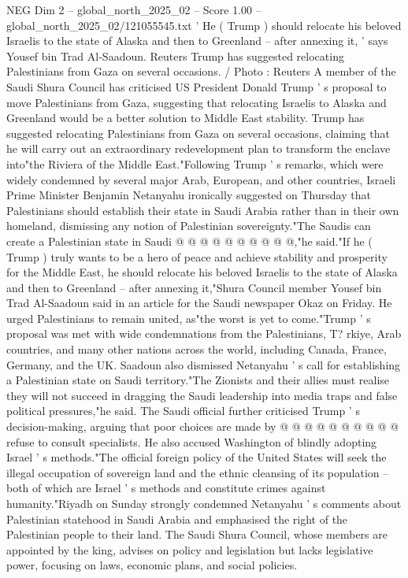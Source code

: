 \begin{textsample}{NEG Dim 2 – global\_north\_2025\_02 – Score 1.00 – global\_north\_2025\_02/121055545.txt}  \label{ex:f2_neg_017}
' He ( Trump ) should relocate his beloved Israelis to the state of Alaska and then to Greenland -- after annexing it, ' says Yousef bin Trad Al-Saadoun.
Reuters Trump has suggested relocating Palestinians from Gaza on several occasions. / Photo : Reuters A member of the Saudi Shura Council has criticised US President Donald Trump ' s proposal to move Palestinians from Gaza, suggesting that relocating Israelis to Alaska and Greenland would be a better solution to Middle East stability.
Trump has suggested relocating Palestinians from Gaza on several occasions, claiming that he will carry out an extraordinary redevelopment plan to transform the enclave into"the Riviera of the Middle East."Following Trump ' s remarks, which were widely condemned by several major Arab, European, and other countries, Israeli Prime Minister Benjamin Netanyahu ironically suggested on Thursday that Palestinians should establish their state in Saudi Arabia rather than in their own homeland, dismissing any notion of Palestinian sovereignty."The Saudis can create a Palestinian state in Saudi @ @ @ @ @ @ @ @ @ @,"he said."If he ( Trump ) truly wants to be a hero of peace and achieve stability and prosperity for the Middle East, he should relocate his beloved Israelis to the state of Alaska and then to Greenland -- after annexing it,"Shura Council member Yousef bin Trad Al-Saadoun said in an article for the Saudi newspaper Okaz on Friday.
He urged Palestinians to remain united, as"the worst is yet to come."Trump ' s proposal was met with wide condemnations from the Palestinians, T? rkiye, Arab countries, and many other nations across the world, including Canada, France, Germany, and the UK.
Saadoun also dismissed Netanyahu ' s call for establishing a Palestinian state on Saudi territory."The Zionists and their allies must realise they will not succeed in dragging the Saudi leadership into media traps and false political pressures,"he said.
The Saudi official further criticised Trump ' s decision-making, arguing that poor choices are made by @ @ @ @ @ @ @ @ @ @ refuse to consult specialists.
He also accused Washington of blindly adopting Israel ' s methods."The official foreign policy of the United States will seek the illegal occupation of sovereign land and the ethnic cleansing of its population -- both of which are Israel ' s methods and constitute crimes against humanity."Riyadh on Sunday strongly condemned Netanyahu ' s comments about Palestinian statehood in Saudi Arabia and emphasised the right of the Palestinian people to their land.
The Saudi Shura Council, whose members are appointed by the king, advises on policy and legislation but lacks legislative power, focusing on laws, economic plans, and social policies.

\end{textsample}
